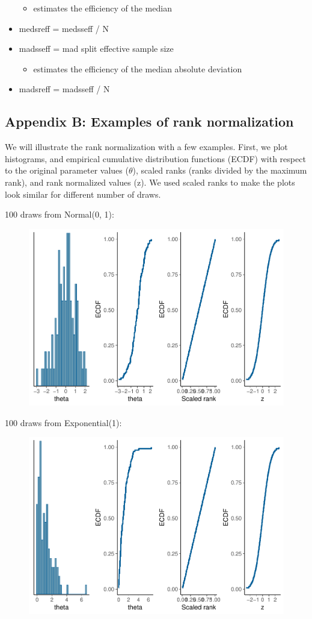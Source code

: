 \documentclass[american,]{article}
\providecommand{\tightlist}{%
  \setlength{\itemsep}{0pt}\setlength{\parskip}{0pt}}
\begin{document}
\begin{itemize}
  \begin{itemize}
  \tightlist
  \item
    estimates the efficiency of the median
  \end{itemize}
\item
  medsreff = medsseff / N
\item
  madsseff = mad split effective sample size

  \begin{itemize}
  \tightlist
  \item
    estimates the efficiency of the median absolute deviation
  \end{itemize}
\item
  madsreff = madsseff / N
\end{itemize}

\hypertarget{AppendixB}{%
\subsection*{Appendix B: Examples of rank
normalization}\label{AppendixB}}

We will illustrate the rank normalization with a few examples. First, we
plot histograms, and empirical cumulative distribution functions (ECDF)
with respect to the original parameter values (\(\theta\)), scaled ranks
(ranks divided by the maximum rank), and rank normalized values (z). We
used scaled ranks to make the plots look similar for different number of
draws.

100 draws from Normal(0, 1):

\begin{figure}[t]
  \centering
  \includegraphics[width=0.6\linewidth]{graphics/ranknorm-normal-1.pdf}
\end{figure}

100 draws from Exponential(1):

\begin{figure}[t]
  \centering
  \includegraphics[width=0.6\linewidth]{graphics/ranknorm-exp-1.pdf}
\end{figure}
\end{document}

